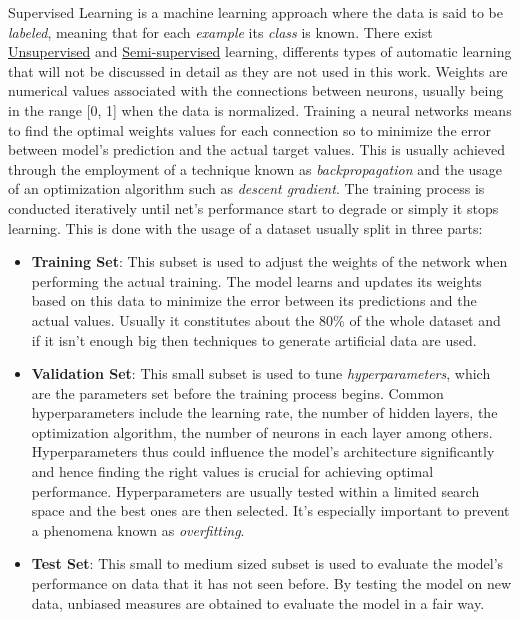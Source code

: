 \documentclass[../Thesis.tex]{subfiles}
\begin{document}
Supervised Learning is a machine learning approach where the data is said to be \emph{labeled}, meaning that for each \emph{example} its \emph{class} is known. There exist \href{https://en.wikipedia.org/wiki/Unsupervised_learning}{Unsupervised} and \href{https://en.wikipedia.org/wiki/Weak_supervision}{Semi-supervised} learning, differents types of automatic learning that will not be discussed in detail as they are not used in this work. Weights are numerical values associated with the connections between neurons, usually being in the range [0, 1] when the data is normalized. Training a neural networks means to find the optimal weights values for each connection so to minimize the error between model's prediction and the actual target values. This is usually achieved through the employment of a technique known as \emph{backpropagation} and the usage of an optimization algorithm such as \emph{descent gradient}. The training process is conducted iteratively until net's performance start to degrade or simply it stops learning. This is done with the usage of a dataset usually split in three parts:

\begin{itemize}
	\item \textbf{Training Set}: This subset is used to adjust the weights of the network when performing the actual training. The model learns and updates its weights based on this data to minimize the error between its predictions and the actual values. Usually it constitutes about the 80\% of the whole dataset and if it isn't enough big then techniques to generate artificial data are used.
	
	\item \textbf{Validation Set}: This small subset is used to tune \emph{hyperparameters}, which are the parameters set before the training process begins. Common hyperparameters include the learning rate, the number of hidden layers, the optimization algorithm, the number of neurons in each layer among others. Hyperparameters thus could influence the model's architecture significantly and hence finding the right values is crucial for achieving optimal performance. Hyperparameters are usually tested within a limited search space and the best ones are then selected. It's especially important to prevent a phenomena known as \emph{overfitting}.
	
	\item \textbf{Test Set}: This small to medium sized subset is used to evaluate the model's performance on data that it has not seen before. By testing the model on new data, unbiased measures are obtained to evaluate the model in a fair way.
\end{itemize}
\end{document}
